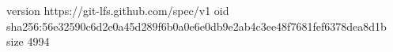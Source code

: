 version https://git-lfs.github.com/spec/v1
oid sha256:56e32590c6d2e0a45d289f6b0a0e6e0db9e2ab4c3ee48f7681fef6378dea8d1b
size 4994
